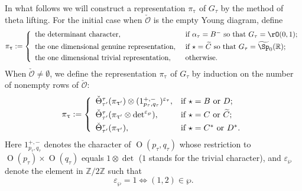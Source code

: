 \documentclass[12pt,a4paper]{amsart}
\def\abs#1{\left|{#1}\right|}
\newcommand{\CO}{{\mathcal {O}}}
\newcommand{\oO}{\operatorname{O}}
\newcommand{\Z}{\mathbb{Z}}
\newcommand{\R}{\mathbb R}
\numberwithin{equation}{section}
\theoremstyle{remark}
\begin{document}
 In what follows we will construct a representation $\pi_{\uptau}$ of $G_\tau$ by the method of theta lifting. For the initial case when $\check \CO$ is the empty Young diagram, define
 \[
 \pi_{\uptau}:= \left\{
     \begin{array}{ll}
                    \textrm{the determinant character} , &\hbox{ if $\alpha_\tau=B^-$ so that $G_\tau=\rO(0,1)$;} \smallskip\\
                    \textrm{the one dimensional genuine representation} , &\hbox{ if $\star=\widetilde C$ so that $G_\tau=\widetilde{\Sp}_0(\R)$;} \smallskip\\
 \textrm{the one dimensional trivial representation} , &\hbox{ otherwise.}            \end{array}
   \right.
\]
When $\check \CO\neq\emptyset$,   we define the representation $\pi_{\uptau}$ of $G_\tau$ by induction on the number of nonempty rows of $\check \CO$:
 \begin{equation}\label{eq:def-pi}
    \pi_{\uptau}:=\left\{
     \begin{array}{ll}
         \check \Theta_{\tau'}^{\tau}(\pi_{\uptau'})\otimes (1_{p_\tau, q_\tau}^{+,-})^{\varepsilon_{\tau}}, &\hbox{if  $\star=B$ or $D$}; \smallskip \\
         \check \Theta_{\tau'}^{\tau}(\pi_{\uptau'}\otimes \det^{\varepsilon_{\wp}}), &\hbox{if $\star=C$ or $\widetilde C$};  \smallskip\\
              \check \Theta_{\tau'}^{\tau}(\pi_{\uptau'}), &\hbox{if $\star=C^*$ or $D^*$}. \\
            \end{array}
   \right.
 \end{equation}
 Here $1_{p_\tau, q_\tau}^{+,-}$ denotes the character of $\oO(p_\tau, q_\tau)$ whose restriction to $\oO(p_\tau)\times \oO(q_\tau)$ equals $1\otimes \det$ ($1$ stands for the trivial character), and
$\varepsilon_{\wp}$ denote the element in $\Z/2\Z$ such that  \[
 \varepsilon_{\wp}=1\Leftrightarrow  (1,2)\in \wp.
\]
\end{document}

